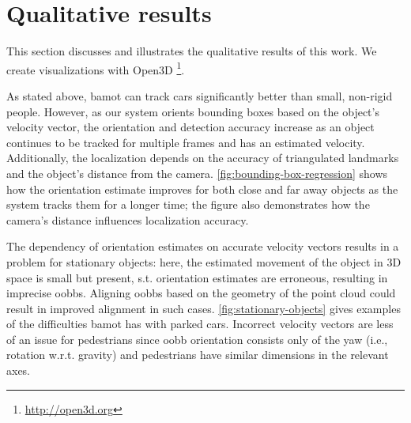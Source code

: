 \documentclass[headsepline, hidelinks, footsepline, footinclude=false, oneside, fontsize=11pt, paper=a4, listof=totoc, bibliography=totoc]{scrbook}
\begin{document}
\section{Qualitative results}
\label{sec:org1975eeb}
   This section discusses and illustrates the qualitative results of this work. 
We create visualizations with Open3D \cite{zhouOpen3DModernLibrary2018} \footnote{\url{http://open3d.org}}.

As stated above, \gls{bamot} can track cars significantly better than small, non-rigid people. 
However, as our system orients bounding boxes based on the object's velocity vector, the orientation and detection accuracy increase as an object continues to be tracked for multiple frames and has an estimated velocity.
Additionally, the localization depends on the accuracy of triangulated landmarks and the object's distance from the camera.
\cref{fig:bounding-box-regression} shows how the orientation estimate improves for both close and far away objects as the system tracks them for a longer time; 
the figure also demonstrates how the camera's distance influences localization accuracy.

The dependency of orientation estimates on accurate velocity vectors results in a problem for stationary objects: here, the estimated movement of the object in 3D space is small but present, s.t. orientation estimates
are erroneous, resulting in imprecise \glspl{oobb}. Aligning \glspl{oobb} based on the geometry of the point cloud could result in improved alignment in such cases.
\cref{fig:stationary-objects} gives examples of the difficulties \gls{bamot} has with parked cars. Incorrect velocity vectors are less of an issue for pedestrians since \gls{oobb} orientation consists only of the yaw (i.e., rotation w.r.t. gravity) and
pedestrians have similar dimensions in the relevant axes.
\end{document}
